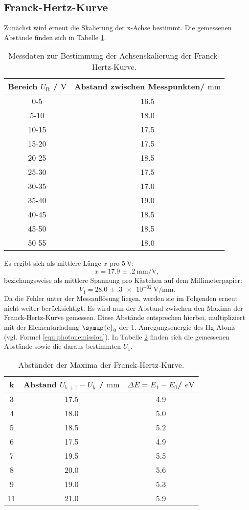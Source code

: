 \subsection{Franck-Hertz-Kurve}
Zunächst wird erneut die Skalierung der x-Achse bestimmt.
Die gemessenen Abstände finden sich in Tabelle \ref{tab:franckie}.
\begin{table}
 \centering
 \caption{Messdaten zur Bestimmung der Achsenskalierung der Franck-Hertz-Kurve.}
 \label{tab:franckie}
 \begin{tabular}{cc}
	 \toprule
	 Bereich $U_{\mathrm{B}}$ / $\si{\volt}$ & Abstand zwischen Messpunkten/ $\si{\milli\meter}$ \\
	 \midrule
	 0-5 & 16.5 \\
	 5-10 & 18.0 \\
	 10-15 & 17.5 \\
	 15-20 & 17.5 \\
	 20-25 & 18.5 \\
	 25-30 & 17.5 \\
	 30-35 & 17.0 \\
	 35-40 & 19.0 \\
	 40-45 & 18.5 \\
	 45-50 & 18.5 \\
	 50-55 & 18.0 \\
	 \bottomrule
 \end{tabular}
\end{table}
Es ergibt sich als mittlere Länge $x$ pro $\SI{5}{\volt}$:
\begin{equation}
	x=\SI{17.9(2)}{\milli\meter\per\volt} \mathrm{,}
\end{equation}
beziehungsweise als mittlere Spannung pro Kästchen auf dem Millimeterpapier:
\begin{equation}
	V_1= \SI{28.0(3)e-02}{\volt\per\milli\meter} \mathrm{.}
\end{equation}
Da die Fehler unter der Messauflösung liegen, werden sie im Folgenden erneut nicht weiter berücksichtigt.
Es wird nun der Abstand zwischen den Maxima der Franck-Hertz-Kurve gemessen. Diese Abstände entsprechen hierbei, multipliziert mit der Elementarladung $\symup{e}_0$ der 1. Anregungsenergie des Hg-Atoms (vgl. Formel \eqref{eqn:photonemission}).
In Tabelle \ref{tab:hertzchen} finden sich die gemessenen Abstände sowie die daraus bestimmten $U_\mathrm{1}$.
\begin{table}
	\centering
	\caption{Abständer der Maxima der Franck-Hertz-Kurve.}
	\label{tab:hertzchen}
	\begin{tabular}{ccc}
		\toprule
		k& Abstand $U_{\mathrm{k+1}}-U_{\mathrm{k}}$ / $\si{\milli\meter}$ & $\Delta E=E_1 - E_0$/ $\si{\electronvolt}$ \\
		\midrule
3&17.5 & 4.9\\
4&18.0 & 5.0\\
5&18.5 & 5.2\\
6&17.5 & 4.9\\
7&19.5 & 5.5\\
8&20.0 & 5.6\\
9&19.0 & 5.3\\
11&21.0 & 5.9\\
\end{tabular}
\end{table}

